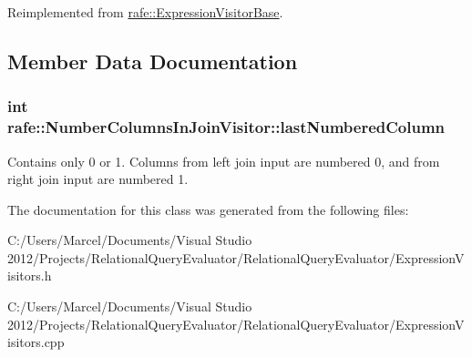 Reimplemented from \hyperlink{classrafe_1_1_expression_visitor_base_a4eaa77bf4105d1cbdde4feb047228255}{rafe\+::\+Expression\+Visitor\+Base}.



\subsection{Member Data Documentation}
\hypertarget{classrafe_1_1_number_columns_in_join_visitor_a332114b3e616548b03a47c34e65f386a}{
\subsubsection[{last\+Numbered\+Column}]{\setlength{\rightskip}{0pt plus 5cm}int rafe\+::\+Number\+Columns\+In\+Join\+Visitor\+::last\+Numbered\+Column}}\label{classrafe_1_1_number_columns_in_join_visitor_a332114b3e616548b03a47c34e65f386a}
Contains only 0 or 1. Columns from left join input are numbered 0, and from right join input are numbered 1. 

The documentation for this class was generated from the following files\+:\begin{DoxyCompactItemize}
\item 
C\+:/\+Users/\+Marcel/\+Documents/\+Visual Studio 2012/\+Projects/\+Relational\+Query\+Evaluator/\+Relational\+Query\+Evaluator/Expression\+Visitors.\+h\item 
C\+:/\+Users/\+Marcel/\+Documents/\+Visual Studio 2012/\+Projects/\+Relational\+Query\+Evaluator/\+Relational\+Query\+Evaluator/Expression\+Visitors.\+cpp\end{DoxyCompactItemize}
